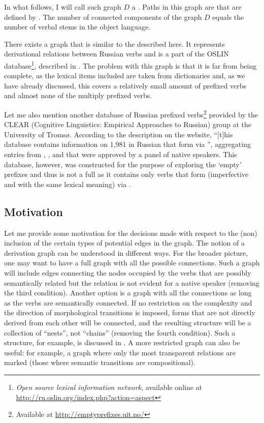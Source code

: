 In what follows, I will call such graph $D$ a \textit{.} Paths in this graph are  that are defined by . The number of connected components of the graph $D$ equals the number of verbal stems in the object language.

There exists a graph that is similar to the  described here. It represents derivational relations between Russian verbs and is a part of the OSLIN database\footnote{\textit{Open source lexical information network}, available online at \url{http://ru.oslin.org/index.php?action=aspect}}, described in \cite{Borik:12}. The problem with this graph is that it is far from being complete, as the lexical items included are taken from dictionaries and, as we have already discussed, this covers a relatively small amount of prefixed verbs and almost none of the multiply prefixed verbs.

Let me also mention another database of Russian prefixed verbs\footnote{Available at \url{http://emptyprefixes.uit.no/}} provided by the CLEAR (Cognitive Linguistics: Empirical Approaches to Russian) group at the University of Troms{\o}. According to the description on the website, ``[t]his database contains information on 1,981  in Russian that form  via '', aggregating entries from \citet{MAS}, \citet{Ozegov:01},  and \citet{Cubberly:82} that were approved by a panel of native speakers. This database, however, was constructed for the purpose of exploring the `empty' prefixes and thus is not a full  as it contains only verbs that form  (imperfective and  with the same lexical meaning) via .

\subsection{Motivation}\label{section:chains:motivation}
Let me provide some motivation for the decisions made with respect to the (non) inclusion of the certain types of potential edges in the graph. The notion of a derivation graph can be understood in different ways. For the broader picture, one may want to have a full graph with all the possible connections. Such a graph will include edges connecting the nodes occupied by the verbs that are possibly semantically related but the relation is not evident for a native speaker (removing the third condition). Another option is a graph with all the connections as long as the verbs are semantically connected. If no restriction on the complexity and the direction of morphological transitions is imposed, forms that are not directly derived from each other will be connected, and the resulting structure will be a collection of ``nests'', not ``chains'' (removing the fourth condition). Such a structure, for example, is discussed in \citealt{Janda:10}. A more restricted graph can also be useful: for example, a graph where only the most transparent relations are marked (those where semantic transitions are compositional). 

